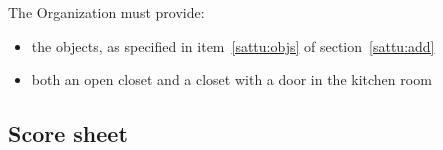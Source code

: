 The Organization must provide:
\begin{itemize}
\item the objects, as specified in item~\ref{sattu:objs} of section~\ref{sattu:add}
\item both an open closet and a closet with a door in the kitchen room
\end{itemize}


\subsection{Score sheet}


